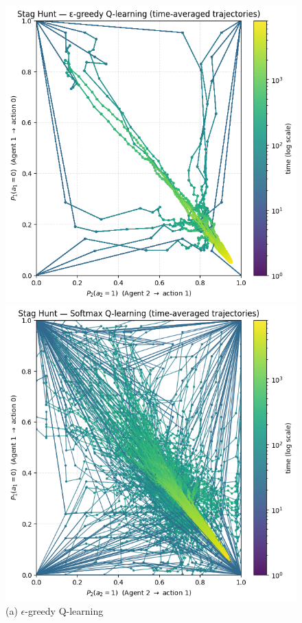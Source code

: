 \begin{figure}[h]
    \centering
    \begin{minipage}{0.32\textwidth}
        \centering
        \includegraphics[width=\linewidth]{figures/task-2/learning/stag_hunt_egreedy.png}
        \caption*{(a) $\epsilon$-greedy Q-learning}
    \end{minipage}
    \hfill
    \begin{minipage}{0.32\textwidth}
        \centering
        \includegraphics[width=\linewidth]{figures/task-2/learning/stag_hunt_boltz.png}

\end{minipage}
\end{figure}
